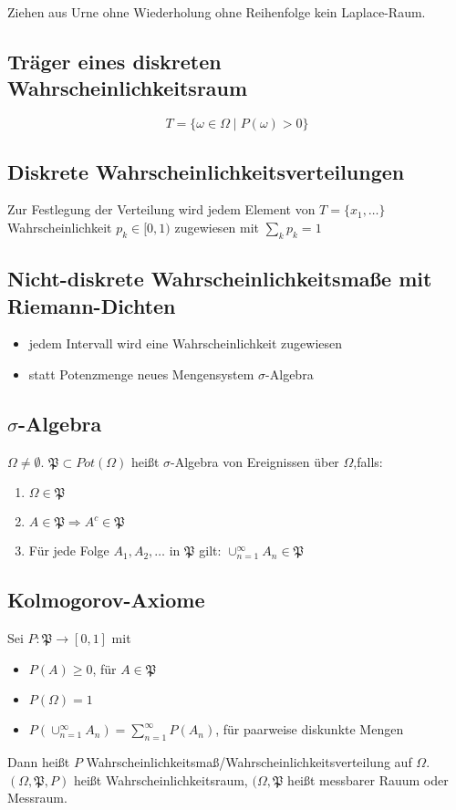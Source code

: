 \documentclass{scrartcl}%
\begin{document}
Ziehen aus Urne ohne Wiederholung ohne Reihenfolge kein Laplace-Raum.

\subsection{Träger eines diskreten Wahrscheinlichkeitsraum}
\[T = \{\omega \in \Omega \mid P(\omega) > 0\}\]

\subsection{Diskrete Wahrscheinlichkeitsverteilungen}
Zur Festlegung der Verteilung wird jedem Element von $T = \{x_1, \ldots\}$ Wahrscheinlichkeit $p_k \in [0,1)$ zugewiesen mit $\sum_k p_k = 1$

\subsection{Nicht-diskrete Wahrscheinlichkeitsmaße mit Riemann-Dichten}
\begin{itemize}
	\item{jedem Intervall wird eine Wahrscheinlichkeit zugewiesen}
	\item{statt Potenzmenge neues Mengensystem $\sigma$-Algebra}
\end{itemize}

\subsection{$\sigma$-Algebra}
$\Omega \neq \emptyset$. $\mathfrak{P} \subset Pot(\Omega)$ heißt $\sigma$-Algebra von Ereignissen über $\Omega$,falls:
\begin{enumerate}
	\item{$\Omega \in \mathfrak{P}$}
	\item{$A \in \mathfrak{P} \Rightarrow A^c \in \mathfrak{P}$}
	\item{Für jede Folge $A_1, A_2,\ldots$ in $\mathfrak{P}$ gilt: $\cup_{n=1}^{\infty} A_n \in \mathfrak{P}$}
\end{enumerate}

\subsection{Kolmogorov-Axiome}
Sei $P:\mathfrak{P} \rightarrow [0,1]$ mit
\begin{itemize}
	\item{$P(A) \geq 0$, für $A \in \mathfrak{P}$}
	\item{$P(\Omega) = 1$}
	\item{$P(\cup_{n=1}^{\infty} A_n) = \sum_{n=1}^{\infty} P (A_n)$, für paarweise diskunkte Mengen} 
\end{itemize}
Dann heißt $P$ Wahrscheinlichkeitsmaß/Wahrscheinlichkeitsverteilung auf $\Omega$. $(\Omega,\mathfrak{P},P)$ heißt Wahrscheinlichkeitsraum, $(\Omega,\mathfrak{P}$ heißt messbarer Rauum oder Messraum.
\end{document}
